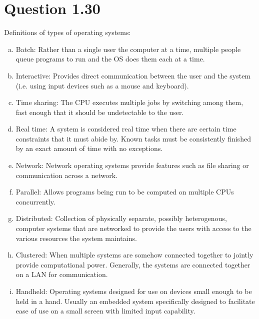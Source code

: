 \documentclass[10pt]{article}
\begin{document}
\section{Question 1.30}
Definitions of types of operating systems:
\begin{enumerate}[a)]
\item Batch: Rather than a single user the computer at a time,
  multiple people queue programs to run and the OS does them each at a
  time. 
  
\item Interactive: Provides direct communication between the user and
  the system (i.e. using input devices such as a mouse and keyboard).
  
\item Time sharing: The CPU executes multiple jobs by switching among
  them, fast enough that it should be undetectable to the user.
  
\item Real time: A system is considered real time when there are
  certain time constraints that it must abide by. Known tasks must be
  consistently finished by an exact amount of time with no exceptions.
  
\item Network: Network operating systems provide features such as file
  sharing or communication across a network.
  
\item Parallel: Allows programs being run to be computed on multiple
  CPUs concurrently. 
  
\item Distributed: Collection of physically separate, possibly
  heterogenous, computer systems that are networked to provide the
  users with access to the various resources the system maintains.
  
\item Clustered: When multiple systems are somehow connected together
  to jointly provide computational power. Generally, the systems are
  connected together on a LAN for communication.
  
\item Handheld: Operating systems designed for use on devices small
  enough to be held in a hand. Usually an embedded system specifically
  designed to facilitate ease of use on a small screen with limited
  input capability.
  
\end{enumerate}
\end{document}
